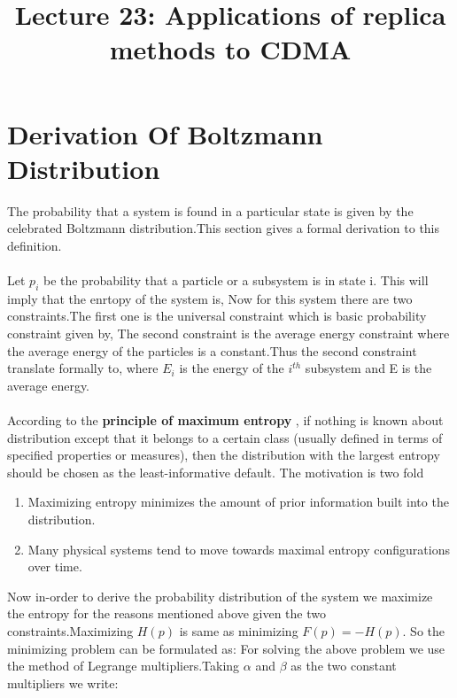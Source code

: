 \documentclass[letterpaper,english,10pt]{article}
\title{Lecture 23: Applications of replica methods to CDMA}
\begin{document}
\maketitle

\section{Derivation Of Boltzmann Distribution}

The probability that a system is found in a particular state is given by the celebrated Boltzmann distribution.This section gives a formal derivation to this definition.\\\\
Let $p_i$ be the probability that a particle or a subsystem is in state i. This will imply that the enrtopy of the system is,
Now for this system there are two constraints.The first one is the universal constraint which is basic probability constraint given by,
The second constraint is the average energy constraint where the average energy of the particles is a constant.Thus the second constraint translate formally to,
where $E_i$ is the energy of the $i^{th}$ subsystem and E is the average energy.\\\\
According to the \textbf{principle of maximum entropy} , if nothing is known about
distribution except that it belongs to a certain class (usually defined in terms of specified
properties or measures), then the distribution with the largest entropy should be chosen as
the least-informative default. The motivation is two fold
\begin{enumerate}
    \item Maximizing entropy minimizes the amount of prior information built into the distribution.
    \item Many physical systems tend to move towards maximal entropy configurations over time.
\end{enumerate}
Now in-order to derive the probability distribution of the system we maximize the entropy for
the reasons mentioned above given the two constraints.Maximizing $H(p)$ is same as minimizing
$F(p)=-H(p)$. So the minimizing problem can be formulated as:
For solving the above problem we use the method of Legrange multipliers.Taking $\alpha$ and
$\beta$ as the two constant multipliers we write:
\end{document}
